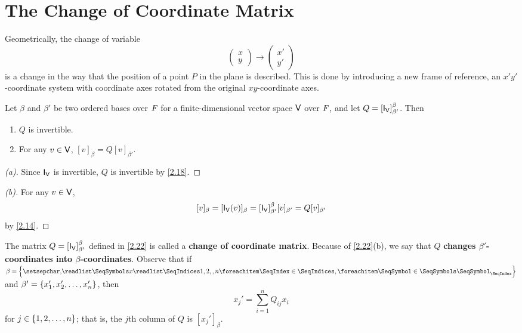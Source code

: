 \section{The Change of Coordinate Matrix}\label{sec:2.5}

\begin{note}
	Geometrically, the change of variable
	\[
		\begin{pmatrix}
			x \\
			y
		\end{pmatrix} \to \begin{pmatrix}
			x' \\
			y'
		\end{pmatrix}
	\]
	is a change in the way that the position of a point \(P\) in the plane is described.
	This is done by introducing a new frame of reference, an \(x' y'\)-coordinate system with coordinate axes rotated from the original \(xy\)-coordinate axes.
\end{note}

\begin{thm}\label{2.22}
	Let \(\beta\) and \(\beta'\) be two ordered bases over \(\mathit{F}\) for a finite-dimensional vector space \(\mathsf{V}\) over \(\mathit{F}\), and let \(Q = [\IT[\V]]_{\beta'}^{\beta}\).
	Then
	\begin{enumerate}
		\item \(Q\) is invertible.
		\item For any \(v \in \mathsf{V}\), \([v]_{\beta} = Q [v]_{\beta'}\).
	\end{enumerate}
\end{thm}

\begin{proof}[(a)]
	Since \(\IT[\V]\) is invertible, \(Q\) is invertible by \cref{2.18}.
\end{proof}

\begin{proof}[(b)]
	For any \(v \in \mathsf{V}\),
	\[
		[v]_{\beta} = [\IT[\V](v)]_{\beta} = [\IT[\V]]_{\beta'}^{\beta} [v]_{\beta'} = Q [v]_{\beta'}
	\]
	by \cref{2.14}.
\end{proof}

\begin{defn}\label{2.5.1}
	The matrix \(Q = [\IT[\V]]_{\beta'}^{\beta}\) defined in \cref{2.22} is called a \textbf{change of coordinate matrix}.
	Because of \cref{2.22}(b), we say that \(Q\) \textbf{changes \(\beta'\)-coordinates into \(\beta\)-coordinates}.
	Observe that if \(\beta = \set{\seq{x}{1,2,,n}}\) and \(\beta' = \left\lbrace x_1', x_2', \dots, x_n'\right\rbrace\), then
	\[
		x_j' = \sum_{i = 1}^n Q_{i j} x_i
	\]
	for \(j \in \left\lbrace1, 2, \dots, n\right\rbrace\);
	that is, the \(j\)th column of \(Q\) is \([x_j']_{\beta}\).
\end{defn}

